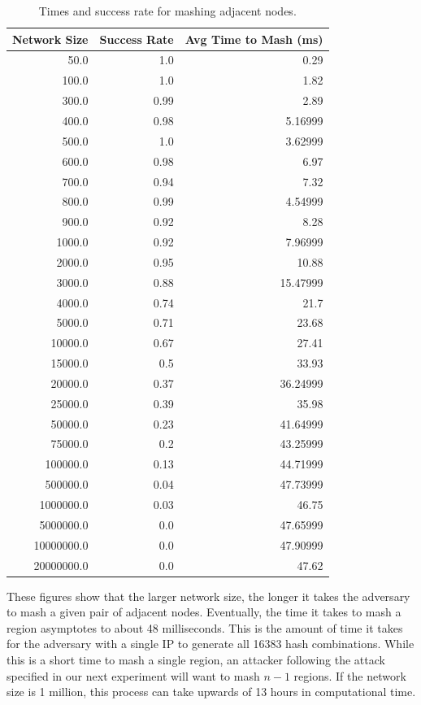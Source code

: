 \documentclass[11pt,conference]{IEEEtran}
\begin{document}
\begin{table}\small
    \centering
    \caption{Times and success rate for mashing adjacent nodes.}
    \label{tab:exp1}
\begin{tabular}{|r|r|r|}
    \hline
    Network Size &  Success Rate &  Avg Time to Mash (ms) \\ \hline
    50.0 & 1.0 & 0.29 \\ \hline
    100.0 & 1.0 & 1.82 \\ \hline
    300.0 & 0.99 & 2.89 \\ \hline
    400.0 & 0.98 & 5.16999 \\ \hline
    500.0 & 1.0 & 3.62999 \\ \hline
    600.0 & 0.98 & 6.97 \\ \hline
    700.0 & 0.94 & 7.32 \\ \hline
    800.0 & 0.99 & 4.54999 \\ \hline
    900.0 & 0.92 & 8.28 \\ \hline
    1000.0 & 0.92 & 7.96999 \\ \hline
    2000.0 & 0.95 & 10.88 \\ \hline
    3000.0 & 0.88 & 15.47999 \\ \hline
    4000.0 & 0.74 & 21.7 \\ \hline
    5000.0 & 0.71 & 23.68 \\ \hline
    10000.0 & 0.67 & 27.41 \\ \hline
    15000.0 & 0.5 & 33.93 \\ \hline
    20000.0 & 0.37 & 36.24999 \\ \hline
    25000.0 & 0.39 & 35.98 \\ \hline
    50000.0 & 0.23 & 41.64999 \\ \hline
    75000.0 & 0.2 & 43.25999 \\ \hline
    100000.0 & 0.13 & 44.71999 \\ \hline
    500000.0 & 0.04 & 47.73999 \\ \hline
    1000000.0 & 0.03 & 46.75 \\ \hline
    5000000.0 & 0.0 & 47.65999 \\ \hline
    10000000.0 & 0.0 & 47.90999 \\ \hline
    20000000.0 & 0.0 & 47.62 \\ \hline
    
\end{tabular}
\end{table}
These figures show that the larger network size, the longer it takes the adversary to mash a given pair of adjacent nodes.
Eventually, the time it takes to mash a region asymptotes to about 48 milliseconds.
This is the amount of time it takes for the adversary with a single IP to generate all 16383 hash combinations.
While this is a short time to mash a single region, an attacker following the attack specified in our next experiment will want to mash $n-1$ regions.
If the network size is 1 million, this process can take upwards of 13 hours in computational time.
\end{document}
